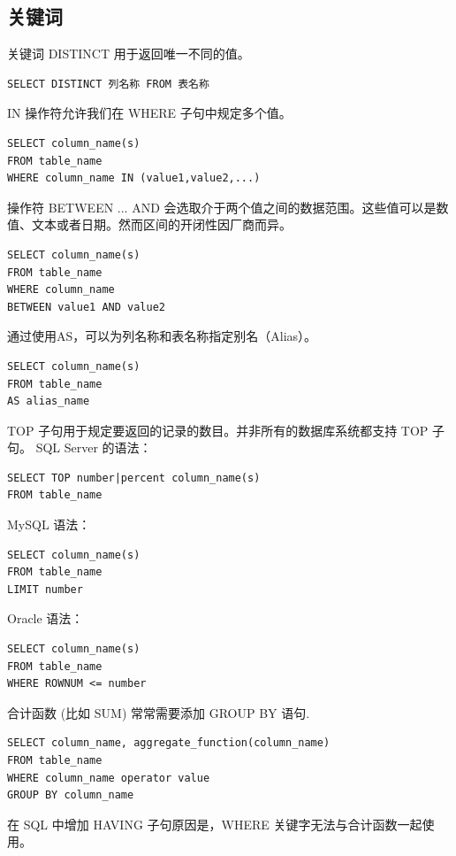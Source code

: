\subsection{关键词}
关键词 DISTINCT 用于返回唯一不同的值。
\begin{verbatim}
SELECT DISTINCT 列名称 FROM 表名称
\end{verbatim}


IN 操作符允许我们在 WHERE 子句中规定多个值。

\begin{verbatim}
SELECT column_name(s)
FROM table_name
WHERE column_name IN (value1,value2,...)
\end{verbatim}

操作符 BETWEEN ... AND 会选取介于两个值之间的数据范围。这些值可以是数值、文本或者日期。然而区间的开闭性因厂商而异。

\begin{verbatim}
SELECT column_name(s)
FROM table_name
WHERE column_name
BETWEEN value1 AND value2
\end{verbatim}

通过使用AS，可以为列名称和表名称指定别名（Alias）。

\begin{verbatim}
SELECT column_name(s)
FROM table_name
AS alias_name
\end{verbatim}

TOP 子句用于规定要返回的记录的数目。并非所有的数据库系统都支持 TOP 子句。
SQL Server 的语法： 
\begin{verbatim}
SELECT TOP number|percent column_name(s)
FROM table_name
\end{verbatim}

MySQL 语法：
\begin{verbatim}
SELECT column_name(s)
FROM table_name
LIMIT number
\end{verbatim}

Oracle 语法：
\begin{verbatim}
SELECT column_name(s)
FROM table_name
WHERE ROWNUM <= number
\end{verbatim}

合计函数 (比如 SUM) 常常需要添加 GROUP BY 语句.
\begin{verbatim}
SELECT column_name, aggregate_function(column_name)
FROM table_name
WHERE column_name operator value
GROUP BY column_name
\end{verbatim}

在 SQL 中增加 HAVING 子句原因是，WHERE 关键字无法与合计函数一起使用。

